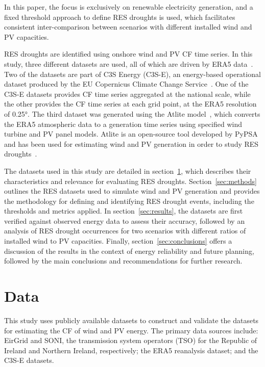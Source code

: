 \documentclass[preprint, 12pt]{elsarticle}
\begin{document}
In this paper, the focus is exclusively on renewable electricity generation, and a fixed threshold approach to define RES droughts is used, which facilitates consistent inter-comparison between scenarios with different installed wind and PV capacities.

RES droughts are identified using onshore wind and PV CF time series. In this study, three different datasets are used, all of which are driven by ERA5 data~\citep{hersbach2020era5}. Two of the datasets are part of C3S Energy (C3S-E), an energy-based operational dataset produced by the EU Copernicus Climate Change Service~\citep{dubus2023energy}. One of the C3S-E datasets provides CF time series aggregated at the national scale, while the other provides the CF time series at each grid point, at the ERA5 resolution of 0.25°. The third dataset was generated using the Atlite model~\citep{hofman2021atlite}, which converts the ERA5 atmospheric data to a generation time series using specified wind turbine and PV panel models. Atlite is an open-source tool developed by PyPSA~\citep{hofman2021atlite} and has been used for estimating wind and PV generation in order to study RES droughts~\citep{mockert2023drought}.

The datasets used in this study are detailed in section~\ref{sec:data}, which describes their characteristics and relevance for evaluating RES droughts. Section~\ref{sec:methods} outlines the RES datasets used to simulate wind and PV generation and provides the methodology for defining and identifying RES drought events, including the thresholds and metrics applied. In section~\ref{sec:results}, the datasets are first verified against observed energy data to assess their accuracy, followed by an analysis of RES drought occurrences for two scenarios with different ratios of installed wind to PV capacities. Finally, section~\ref{sec:conclusions} offers a discussion of the results in the context of energy reliability and future planning, followed by the main conclusions and recommendations for further research.

\section{Data}
\label{sec:data}

This study uses publicly available datasets to construct and validate the datasets for estimating the CF of wind and PV energy. The primary data sources include: EirGrid and SONI, the transmission system operators (TSO) for the Republic of Ireland and Northern Ireland, respectively; the ERA5 reanalysis dataset; and the C3S-E datasets.
\end{document}
